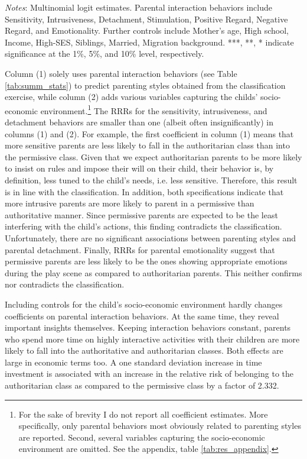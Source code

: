 \begin{table}[!htbp]
\begin{threeparttable}
\begin{tabular}[t]{llccc}
			\bottomrule
		\end{tabular}
		\begin{tablenotes}
			\small
			\item \textit{Notes}: Multinomial logit estimates. Parental interaction behaviors include Sensitivity, Intrusiveness, Detachment, Stimulation,
			Positive Regard, Negative Regard, and Emotionality. Further controls include Mother's age, High school, Income, High-SES, Siblings,
			Married, Migration background.
			 ***, **, * indicate significance at the 1\%, 5\%, and 10\% level,
			respectively.
		\end{tablenotes}
	\end{threeparttable}
\end{table}
%
Column (1) solely uses parental interaction behaviors (see Table \ref{tab:summ_stats}) to predict parenting styles obtained from the classification exercise, while column (2) adds various variables capturing the childs' socio-economic environment.\footnote{
For the sake of brevity I do not report all coefficient estimates. More specifically, only parental behaviors most obviously related to parenting styles are reported. Second, several variables capturing the socio-economic environment are omitted. See the appendix, table \ref{tab:res_appendix}.
} 
The RRRs for the sensitivity, intrusiveness, and detachment behaviors are smaller than one (albeit often insignificantly) in columns (1) and (2). For example, the first coefficient in column (1) means that more sensitive parents are less likely to fall in the authoritarian class than into the permissive class. Given that we expect authoritarian parents to be more likely to insist on rules and impose their will on their child, their behavior is, by definition, less tuned to the child's needs, i.e. less sensitive. Therefore, this result is in line with the classification.
%
In addition, both specifications indicate that more intrusive parents are more likely to parent in a permissive than authoritative manner. Since permissive parents are expected to be the least interfering with the child's actions, this finding contradicts the classification. Unfortunately, there are no significant associations between parenting styles and parental detachment. Finally, RRRs for parental emotionality suggest that permissive parents are less likely to be the ones showing appropriate emotions during the play scene as compared to authoritarian parents. This neither confirms nor contradicts the classification.

Including controls for the child's socio-economic environment hardly changes coefficients on parental interaction behaviors. At the same time, they reveal important insights themselves. Keeping interaction behaviors constant, parents who spend more time on highly interactive activities with their children are more likely to fall into the authoritative and authoritarian classes. Both effects are large in economic terms too. A one standard deviation increase in time investment is associated with an increase in the relative risk of belonging to the authoritarian class as compared to the permissive class by a factor of 2.332.

